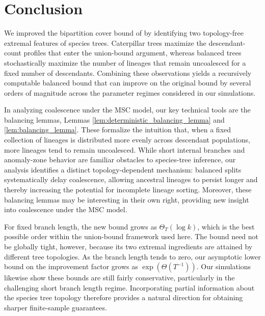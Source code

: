 \section{Conclusion}
\label{sec:conclusion}

We improved the bipartition cover bound of \citet{uricchio2016_bipartition_cover}
by identifying two topology-free extremal features of species trees. Caterpillar
trees maximize the descendant-count profiles that enter the union-bound argument,
whereas balanced trees stochastically maximize the number of lineages that remain
uncoalesced for a fixed number of descendants. Combining these observations yields
a recursively computable balanced bound that can improve on the original bound by
several orders of magnitude across the parameter regimes considered in our
simulations.

In analyzing coalescence under the MSC model, our key technical tools are the balancing lemmas, Lemmas \ref{lem:deterministic_balancing_lemma} and
\ref{lem:balancing_lemma}. These formalize the intuition that, when a fixed collection of
lineages is distributed more evenly across descendant populations, more lineages tend to remain
uncoalesced. While short internal branches and anomaly-zone behavior are familiar obstacles to
species-tree inference, our analysis identifies a distinct topology-dependent mechanism: balanced
splits systematically delay coalescence, allowing ancestral lineages to persist longer
and thereby increasing the potential for incomplete lineage sorting. Moreover, these
balancing lemmas may be interesting in their own right, providing new insight into coalescence
under the MSC model.

For fixed branch length, the new bound grows as $\Theta_T(\log k)$, which is the
best possible order within the union-bound framework used here. The bound need
not be globally tight, however, because its two extremal ingredients are attained
by different tree topologies. As the branch length tends to zero, our asymptotic
lower bound on the improvement factor grows as $\exp(\Theta(T^{-1}))$. Our simulations likewise show these bounds are still
fairly conservative, particularly in the challenging short branch length regime.
Incorporating partial information about the species tree topology therefore
provides a natural direction for obtaining sharper finite-sample guarantees.

